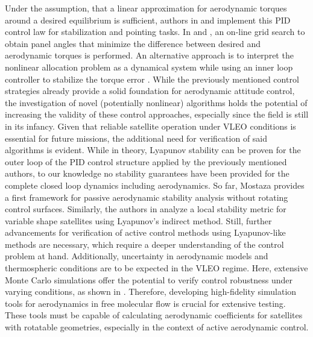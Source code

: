 \documentclass[pdflatex,sn-mathphys-num]{sn-jnl}%
\theoremstyle{thmstyleone}%
\theoremstyle{thmstyletwo}%
\theoremstyle{thmstylethree}%
\begin{document}
	Under the assumption, that a linear approximation for aerodynamic torques around a desired equilibrium is sufficient, authors in \cite{chenAerodynamicAttitudeControl2023} and \cite{canasAttitudeControlSatellites2020}  implement this PID control law for stabilization and pointing tasks.
	In \cite{livadiottiUncertaintiesDesignActive2022} and \cite{changAerodynamicSatelliteAttitude}, an on-line grid search to obtain panel angles that minimize the difference between desired and aerodynamic torques is performed. An alternative approach is to interpret the nonlinear allocation problem as a dynamical system while using an inner loop controller to stabilize the torque error \cite{gargaszOptimalSpacecraftAttitude, sabatiniAerodynamicCoordinatedControl2024}. 
	While the previously mentioned control strategies already provide a solid foundation for aerodynamic attitude control, the investigation of novel (potentially nonlinear) algorithms holds the potential of increasing the validity of these control approaches, especially since the field is still in its infancy.
	Given that reliable satellite operation under VLEO conditions is essential for future missions, the additional need for verification of said algorithms is evident. 
	While in theory, Lyapunov stability can be proven for the outer loop of the PID control structure applied by the previously mentioned authors, to our knowledge no stability guarantees have been provided for the complete closed loop dynamics including aerodynamics.
	So far, Mostaza \cite{mostazaMethodologyAnalyzeAttitude2016} provides a first framework for passive aerodynamic stability analysis without rotating control surfaces. Similarly, the authors in \cite{miyamotoAttitudeDynamicsSatellites2023} analyze a local stability metric for variable shape satellites using Lyapunov's indirect method. Still, further advancements for verification of active control methods using Lyapunov-like methods are necessary, which require a deeper understanding of the control problem at hand.
	Additionally, uncertainty in aerodynamic models and thermospheric conditions are to be expected in the VLEO regime. Here, extensive Monte Carlo simulations offer the potential to verify control robustness under varying conditions, as shown in \cite{livadiottiUncertaintiesDesignActive2022}. 
	Therefore, developing high-fidelity simulation tools for aerodynamics in free molecular flow is crucial for extensive testing. These tools must be capable of calculating aerodynamic coefficients for satellites with rotatable geometries, especially in the context of active aerodynamic control.
\end{document}
